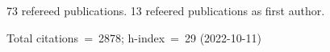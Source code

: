 73 refereed publications. 13 refeered publications as first author.

Total citations~=~2878; h-index~=~29 (2022-10-11)